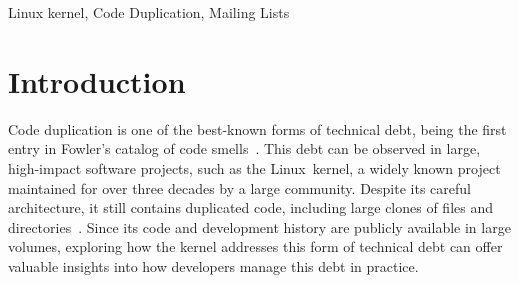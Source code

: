 \documentclass[10pt,conference]{IEEEtran}
\begin{document}
\begin{abstract}
Code duplication is one of the best-known forms of technical debt. It makes
maintenance more laborious and can lead to inconsistencies, such as a bug being
fixed in one copy but not in the others. In a large, long-lived project like
the Linux kernel, decisions about duplicated code are debated in the open on
mailing lists, where developers propose, question, and reject refactorings,
shared helpers, and copied implementations. These discussions are a rich source
for understanding how this debt is handled in practice, but they are buried
among millions of unrelated emails. We present LKlones, a dataset
of Linux kernel mailing list threads about code duplication, built on top of
the LKML5Ws dataset. Our pipeline groups emails into threads, in which a regex
filter first selects candidate threads and an AI-based classifier sorts each candidate into categories. Out of 3.7 million threads from 206 mailing lists, the classifier
labels more than 186,000 threads as related to code duplication, and over
33,000 of them are linked to commits that reached the mainline kernel. Each
thread includes its messages, its category with a confidence score, and its
links to commits.
\end{abstract}

\begin{IEEEkeywords}
Linux kernel, Code Duplication, Mailing Lists
\end{IEEEkeywords}

\section{Introduction}

Code duplication is one of the best-known forms of technical debt, being the first entry in Fowler's catalog of code smells~\cite{fowler1999refactoring}. This debt can be observed in large, high-impact software projects, such as the \mbox{Linux kernel}, a widely known project maintained for over three decades by a large community. Despite its careful architecture, it still contains duplicated code, including large clones of files and directories~\cite{kumar2016bigclones}. Since its code and development history are publicly available in large volumes, exploring how the kernel addresses this form of technical debt can offer valuable insights into how developers manage this debt in practice.
\end{document}
